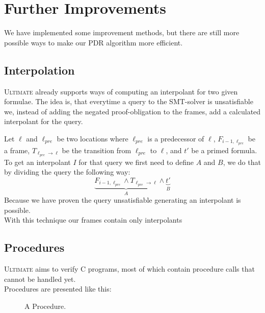 \documentclass[11pt, a4paper, BCOR=10mm, ngerman]{scrbook}
\begin{document}
\section{Further Improvements}
We have implemented some improvement methods, but there are still more possible ways to make our PDR algorithm more efficient.

\subsection{Interpolation}
\textsc{Ultimate} already supports ways of computing an interpolant for two given formulae. The idea is, that everytime a query to the SMT-solver is unsatisfiable we, instead of adding the negated proof-obligation to the frames, add a calculated interpolant for the query. \par
Let $\ell$ and $\ell_{pre}$ be two locations where $\ell_{pre}$ is a predecessor of $\ell$, $F_{i - 1, \ell_{pre}}$ be a frame, $T_{\ell_{pre} \rightarrow \ell}$ be the transition from $\ell_{pre}$ to $\ell$, and $t'$ be a primed formula. \\
To get an interpolant $I$ for that query we first need to define $A$ and $B$, we do that by dividing the query the following way:
\begin{equation*}
\underbrace{F_{i - 1, \ell_{pre}} \land T_{\ell_{pre} \rightarrow \ell}}_{A} \land \underbrace{t'}_B
\end{equation*}
Because we have proven the query unsatisfiable generating an interpolant is possible. \\
With this technique our frames contain only interpolants
\subsection{Procedures}
\textsc{Ultimate} aims to verify C programs, most of which contain procedure calls that cannot be handled yet. \\ Procedures are presented like this: 

\begin{figure}[H]
\centering
{}
  \caption{A Procedure.}
 \end{figure}
 \label{procedure Ex}  
\end{document}
